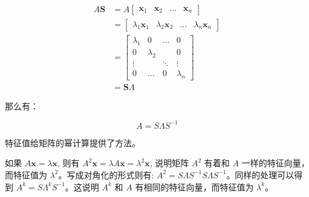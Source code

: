 \documentclass[
  letterpaper,
  DIV=11,
  numbers=noendperiod]{scrartcl}
\begin{document}
\[
\begin{align}
A\mathbf{S} &=  A \begin{bmatrix} \mathbf{x}_1 & \mathbf{x}_2 & \dots & \mathbf{x}_n \end{bmatrix} \\
   &= \begin{bmatrix} \lambda_1\mathbf{x}_1 & \lambda_2\mathbf{x}_2 &  \dots & \lambda_n\mathbf{x}_n \end{bmatrix}\\
   & = \begin{bmatrix} 
        \lambda_1 & 0         & \dots  & 0         \\
        0         & \lambda_2 &        & 0         \\ 
        \vdots    &           & \ddots & \vdots    \\
        0         & \dots     & 0      & \lambda_n  
       \end{bmatrix}  \\
  &= \mathbf{S} \Lambda
\end{align}
\]

那么有：

\[
A = S \Lambda S^{-1}
\]

特征值给矩阵的幂计算提供了方法。

如果 \(A\mathbf{x} = \lambda\mathbf{x}\), 则有
\(A^2\mathbf{x} = \lambda A\mathbf{x} = \lambda^2\mathbf{x}\), 说明矩阵
\(A^2\) 有着和 \(A\) 一样的特征向量，而特征值为
\(\lambda^2\)。写成对角化的形式则有:
\(A^2 = S\Lambda S^{-1} S\Lambda S^{-1}\)。同样的处理可以得到
\(A^{k} = S\Lambda^{k}S^{-1}\)。这说明 \(A^k\) 和 \(A\)
有相同的特征向量，而特征值为 \(\lambda^{k}\)。
\end{document}

